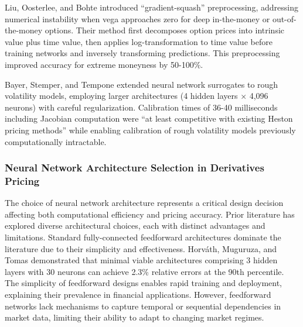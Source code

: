 \documentclass[12pt,a4paper]{article}
\begin{document}
Liu, Oosterlee, and Bohte \cite{Liu2019} introduced ``gradient-squash'' preprocessing, addressing numerical instability when vega approaches zero for deep in-the-money or out-of-the-money options. Their method first decomposes option prices into intrinsic value plus time value, then applies log-transformation to time value before training networks and inversely transforming predictions. This preprocessing improved accuracy for extreme moneyness by 50-100\%.

Bayer, Stemper, and Tempone \cite{BayerStemperTempone2019} extended neural network surrogates to rough volatility models, employing larger architectures (4 hidden layers × 4,096 neurons) with careful regularization. Calibration times of 36-40 milliseconds including Jacobian computation were ``at least competitive with existing Heston pricing methods'' while enabling calibration of rough volatility models previously computationally intractable.


\subsubsection{Neural Network Architecture Selection in Derivatives Pricing}

The choice of neural network architecture represents a critical design decision affecting both computational efficiency and pricing accuracy. Prior literature has explored diverse architectural choices, each with distinct advantages and limitations. Standard fully-connected feedforward architectures dominate the literature due to their simplicity and effectiveness. Horváth, Muguruza, and Tomas \cite{HorvathMuguruzaTomas2019} demonstrated that minimal viable architectures comprising 3 hidden layers with 30 neurons can achieve 2.3\% relative errors at the 90th percentile. The simplicity of feedforward designs enables rapid training and deployment, explaining their prevalence in financial applications. However, feedforward networks lack mechanisms to capture temporal or sequential dependencies in market data, limiting their ability to adapt to changing market regimes.\\[0.05cm]
\end{document}
